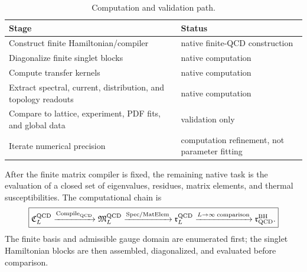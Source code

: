 \documentclass[12pt,a4paper]{article}
\begin{document}
\begin{table}[htbp]
\centering
\footnotesize
\begin{tabular}{>{\raggedright\arraybackslash}p{} >{\raggedright\arraybackslash}p{}}
\toprule
Stage & Status \\
\midrule
Construct finite Hamiltonian/compiler & native finite-QCD construction \\
Diagonalize finite singlet blocks & native computation \\
Compute transfer kernels & native computation \\
Extract spectral, current, distribution, and topology readouts & native computation \\
Compare to lattice, experiment, PDF fits, and global data & validation only \\
Iterate numerical precision & computation refinement, not parameter fitting \\
\bottomrule
\end{tabular}
\caption[Computation and validation path]{Computation and validation path.}
\label{p11:tab:computation-validation-path}
\end{table}

After the finite matrix compiler is fixed, the remaining native task is the evaluation of a closed set of eigenvalues, residues, matrix elements, and thermal susceptibilities.  The computational chain is
\begin{equation}
\label{p11:eq:main-computational-chain}
\boxed{
\mathfrak C_L^{\rm QCD}
\xrightarrow{\operatorname{Compile}_{\rm QCD}}
\mathfrak M_L^{\rm QCD}
\xrightarrow{\operatorname{Spec/MatElem}}
\mathfrak r_L^{\rm QCD}
\xrightarrow{L\to\infty\;{\rm comparison}}
\mathfrak r_{\rm QCD}^{\rm BH}.
}
\end{equation}
The finite basis and admissible gauge domain are enumerated first; the singlet Hamiltonian blocks are then assembled, diagonalized, and evaluated before comparison.
\end{document}
